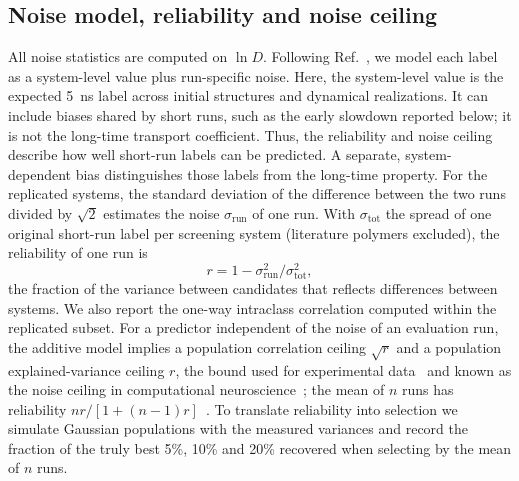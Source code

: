\documentclass[preprint,12pt]{elsarticle}
\begin{document}
\subsection{Noise model, reliability and noise ceiling}\label{sec:noise-method}
All noise statistics are computed on $\ln D$. Following Ref.~\cite{Xie2022Accelerating}, we
model each label as a system-level value plus run-specific noise. Here, the system-level value is
the expected \SI{5}{\nano\second} label across initial structures and dynamical realizations. It
can include biases shared by short runs, such as the early slowdown reported below; it is not the
long-time transport coefficient. Thus, the reliability and noise ceiling describe how well
short-run labels can be predicted. A separate, system-dependent bias distinguishes those labels
from the long-time property.
For the replicated systems, the standard deviation of the difference between the two runs divided
by $\sqrt2$ estimates the noise $\sigma_{\mathrm{run}}$ of one run. With $\sigma_{\mathrm{tot}}$ the
spread of one original short-run label per screening system (literature polymers excluded), the reliability of one run is
\begin{equation}
  r = 1-\sigma_{\mathrm{run}}^2/\sigma_{\mathrm{tot}}^2,
  \label{eq:reliability}
\end{equation}
the fraction of the variance between candidates that reflects differences between systems. We
also report the one-way intraclass correlation computed within the replicated subset. For a predictor independent of the noise of an evaluation run, the additive model implies a
population correlation ceiling $\sqrt r$ and a population explained-variance ceiling $r$, the bound used for experimental
data~\cite{Brown2009Skepticism,Kramer2012Ki} and known as the noise ceiling in computational
neuroscience~\cite{LageCastellanos2019NoiseCeiling}; the mean of $n$ runs has
reliability $nr/[1+(n-1)r]$~\cite{Spearman1910,Brown1910}. To translate reliability into
selection we simulate Gaussian populations with the measured variances and record the fraction of
the truly best 5\%, 10\% and 20\% recovered when selecting by the mean of $n$ runs.
\end{document}
